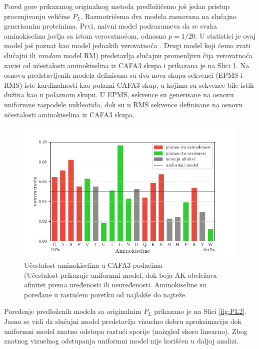 Pored gore prikazanog originalnog metoda predložićemo još jedan pristup
procenjivanju veličine $P_L$.
Razmotrićemo dva modela zasnovana na slučajno generisanim proteinima. Prvi,
naivni model  podrazumeva da se svaka
aminokiselina javlja sa istom verovatnoćom, odnosno $p=1/20$. U statistici je ovaj
model još poznat kao model jednakih verovatnoća .  Drugi model koji ćemo zvati slučajni ili \textit{random} model RM)  predstavlja
slučajnu promenljivu čija verovatnoća zavisi od učestalosti aminokiselina iz
CAFA3 skupa i prikazana je na Slici \ref{fig:AK_ucestalost}.
Na osnovu predstavljenih modela definisana su dva nova skupa sekvenci (EPMS i
RMS) iste kardinalnosti kao polazni CAFA3 skup, u kojima su sekvence bile istih
dužina kao u polaznom skupu. U EPMS, sekvence su generisane na osnovu uniformne
raspodele nukleotida, dok su u RMS sekvence definisane na osnovu učestalosti
aminokiselina iz CAFA3 skupa.


\begin{figure}[th]
\centering
\includegraphics[]{plots/AK_ucestalost}
\caption{
  Učestalost aminokiselina u CAFA3 podacima
  \\ \footnotesize
  (Učestalost prikazuje uniformni model, dok boja AK obeležava afinitet prema
  uređenosti ili neuređenosti. Aminokiseline su poređane u rastućem poretku
  od najlakše do najteže. 
}
\label{fig:AK_ucestalost}
\end{figure}

Poređenje predloženih modela sa originalnim $P_L$ prikazano je na Slici
\ref{fig:PL2}. Jasno se vidi da slučajni model predstavlja vizuelno dobru
aproksimaciju dok uniformni model znatno odstupa rastući sporije (naizgled
skoro linearno).
Zbog znatnog vizuelnog odstupanja uniformni model nije korišćen u daljoj analizi.


